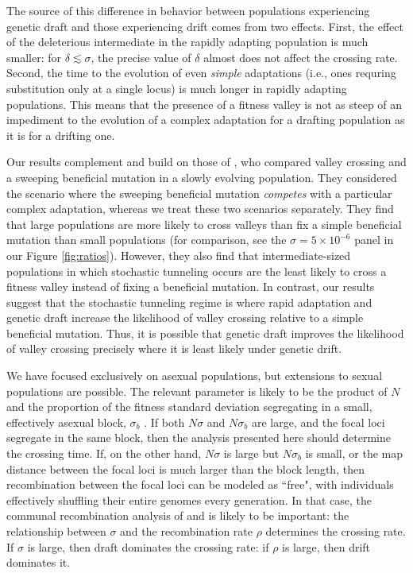\documentclass[10pt,twocolumn,twoside]{gsajnl}
\begin{document}
\begin{spacing}{1.5}
The source of this difference in behavior between populations experiencing genetic draft and those experiencing drift comes from two effects.
First, the effect of the deleterious intermediate in the rapidly adapting population is much smaller: for $\delta \lesssim \sigma$, the precise value of $\delta$ almost does not affect the crossing rate.
Second, the time to the evolution of even \emph{simple} adaptations (i.e., ones requring substitution only at a single locus) is much longer in rapidly adapting populations.
This means that the presence of a fitness valley is not as steep of an impediment to the evolution of a complex adaptation for a drafting population as it is for a drifting one.

Our results complement and build on those of \citet{ochs_2015}, who compared valley crossing and a sweeping beneficial mutation in a slowly evolving population.
They considered the scenario where the sweeping beneficial mutation \emph{competes} with a particular complex adaptation, whereas we treat these two scenarios separately.
They find that large populations are more likely to cross valleys than fix a simple beneficial mutation than small populations (for comparison, see the $\sigma=5 \times 10^{-6}$ panel in our Figure \ref{fig:ratios}).
However, they also find that intermediate-sized populations in which stochastic tunneling occurs are the least likely to cross a fitness valley instead of fixing a beneficial mutation.
In contrast, our results suggest that the stochastic tunneling regime is where rapid adaptation and genetic draft increase the likelihood of valley crossing relative to a simple beneficial mutation.
Thus, it is possible that genetic draft improves the likelihood of valley crossing precisely where it is least likely under genetic drift. 

We have focused exclusively on asexual populations, but extensions to sexual populations are possible.
The relevant parameter is likely to be the product of $N$ and the proportion of the fitness standard deviation segregating in a small, effectively asexual block, $\sigma_b$ \citep{neher_kessinger_2013}.
If both $N\sigma$ and $N\sigma_b$ are large, and the focal loci segregate in the same block, then the analysis presented here should determine the crossing time.
If, on the other hand, $N\sigma$ is large but $N\sigma_b$ is small, or the map distance between the focal loci is much larger than the block length, then recombination between the focal loci can be modeled as ``free", with individuals effectively shuffling their entire genomes every generation.
In that case, the communal recombination analysis of \citet{neher_shraiman_2011} and \citet{neher_shraiman_2010} is likely to be important: the relationship between $\sigma$ and the recombination rate $\rho$ determines the crossing rate.
If $\sigma$ is large, then draft dominates the crossing rate: if $\rho$ is large, then drift dominates it.


\end{spacing}
\end{document}
